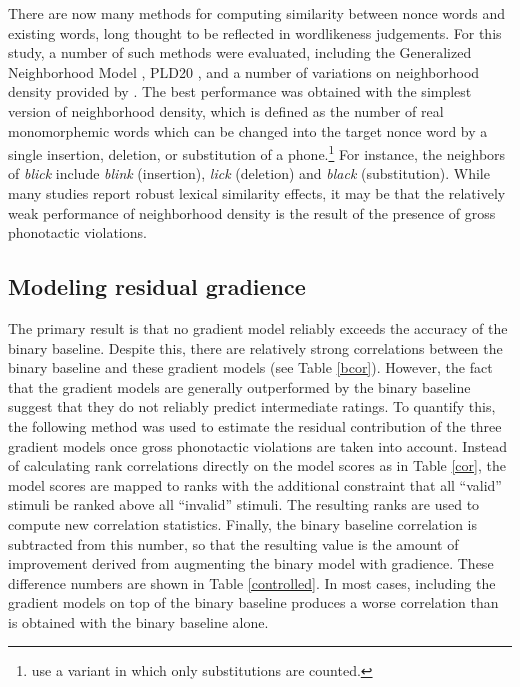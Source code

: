 There are now many methods for computing similarity between nonce words and existing words, long thought to be reflected in wordlikeness judgements. 
For this study, a number of such methods were evaluated, including the Generalized Neighborhood Model \citep{Bailey2001}, PLD20 \citep{Suarez2011}, and a number of variations on neighborhood density \citep{Coltheart1977} provided by \citet{Vaden2009}. The best performance was obtained with the simplest version of neighborhood density, which is defined as the number of real monomorphemic words which can be changed into the target nonce word by a single insertion, deletion, or substitution of a phone.\footnote{\citet{Greenberg1964} use a variant in which only substitutions are counted.} For instance, the neighbors of \emph{blick} include \emph{blink} (insertion), \emph{lick} (deletion) and \emph{black} (substitution). While many studies \citep[e.g.,][]{Bailey2001} report robust lexical similarity effects, it may be that the relatively weak performance of neighborhood density is the result of the presence of gross phonotactic violations.

\subsection{Modeling residual gradience}

The primary result is that no gradient model reliably exceeds the accuracy of the binary baseline. Despite this, there are relatively strong correlations between the binary baseline and these gradient models (see Table \ref{bcor}). However, the fact that the gradient models are generally outperformed by the binary baseline suggest that they do not reliably predict intermediate ratings. To quantify this, the following method was used to estimate the residual contribution of the three gradient models once gross phonotactic violations are taken into account. Instead of calculating rank correlations directly on the model scores as in Table \ref{cor}, the model scores are mapped to ranks with the additional constraint that all ``valid'' stimuli be ranked above all ``invalid'' stimuli. The resulting ranks are used to compute new correlation statistics. Finally, the binary baseline correlation is subtracted from this number, so that the resulting value is the amount of improvement derived from augmenting the binary model with gradience. These difference numbers are shown in Table \ref{controlled}. In most cases, including the gradient models on top of the binary baseline produces a worse correlation than is obtained with the binary baseline alone.

